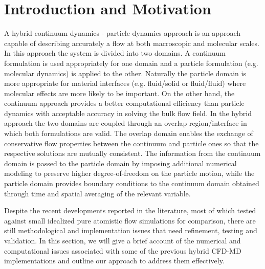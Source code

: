 \documentclass[preprint,12pt]{elsarticle}
\begin{document}


\section{Introduction and Motivation}
\label{sec:intro}

A hybrid continuum dynamics - particle dynamics approach is an approach 
capable of describing accurately a flow at both macroscopic and molecular scales. 
In this approach the system is divided into two domains. 
A continuum formulation is used appropriately for one domain and 
a particle formulation (e.g. molecular dynamics) is applied to the other.
Naturally the particle domain is more appropriate for material interfaces 
(e.g. fluid/solid or fluid/fluid) where molecular effects are more likely to be important. 
On the other hand, the continuum approach provides a better computational efficiency than
particle dynamics with acceptable accuracy in solving the bulk flow field.
In the hybrid approach the two domains are coupled through an overlap region/interface 
in which both formulations are valid. The overlap domain enables the exchange of 
conservative flow properties between the continuum and particle ones so that 
the respective solutions are mutually consistent. 
The information from the continuum domain is passed to the particle domain 
by imposing additional numerical modeling to preserve higher degree-of-freedom 
on the particle motion, while the particle domain provides boundary conditions 
to the continuum domain obtained through time and spatial averaging of the relevant variable.

Despite the recent developments reported in the literature, most of which tested 
against small idealized pure atomistic flow simulations for comparison, 
there are still methodological and implementation issues that need refinement, 
testing and validation. In this section, we will give a brief account of the numerical and 
computational issues associated with some of the previous hybrid CFD-MD implementations 
and outline our approach to address them effectively.
\end{document}
